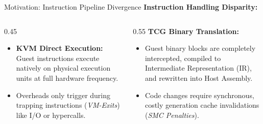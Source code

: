 \documentclass[aspectratio=169]{beamer} %
\begin{document}
  \begin{frame}{Motivation: Instruction Pipeline Divergence}
      \textbf{Instruction Handling Disparity:}
      \begin{columns}[T]
          \begin{column}{0.45\textwidth}
              \begin{itemize}
                  \item \textbf{KVM Direct Execution:} Guest instructions execute natively on physical execution units at full hardware frequency. 
                  \item Overheads only trigger during trapping instructions (\textit{VM-Exits}) like I/O or hypercalls.
              \end{itemize}
          \end{column}

          \begin{column}{0.55\textwidth}
              \vspace{0.2cm}
              \textbf{TCG Binary Translation:}
              \begin{itemize}
                  \item Guest binary blocks are completely intercepted, compiled to Intermediate Representation (IR), and rewritten into Host Assembly.
                  \item Code changes require synchronous, costly generation cache invalidations (\textit{SMC Penalties}).
              \end{itemize}
          \end{column}
      \end{columns}
  \end{frame}
\end{document}

